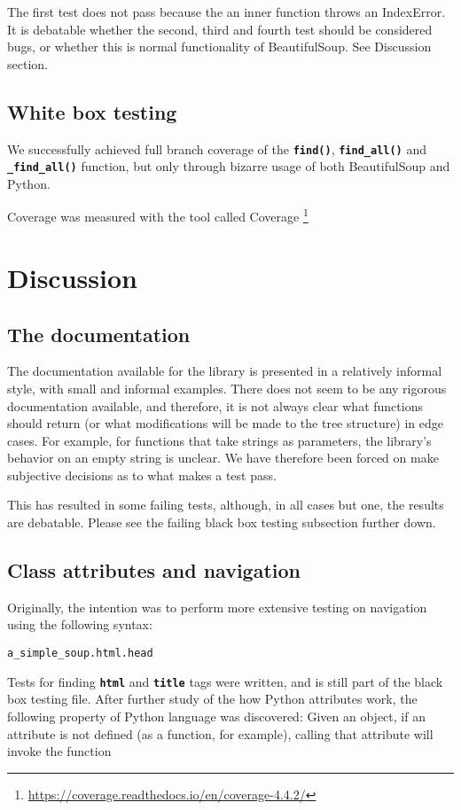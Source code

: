 \documentclass[10pt]{article}
\newcommand{\tbt}[1]{\texttt{\textbf{#1}}}
\begin{document}
The first test does not pass because the an inner function throws an IndexError. \\
It is debatable whether the second, third and fourth test should be considered bugs, or whether this is normal functionality of BeautifulSoup. See Discussion section.

\subsection{White box testing}

We successfully achieved full branch coverage of the \tbt{find()}, \tbt{find\_all()} and \tbt{\_find\_all()} function, but only through bizarre usage of both BeautifulSoup and Python. 

Coverage was measured with the tool called Coverage \footnote{\url{https://coverage.readthedocs.io/en/coverage-4.4.2/}}

\section{Discussion}

\subsection{The documentation}

The documentation available for the library is presented in a relatively informal style, with small and informal examples. There does not seem to be any rigorous documentation available, and therefore, it is not always clear what functions should return (or what modifications will be made to the tree structure) in edge cases. For example, for functions that take strings as parameters, the library's behavior on an empty string is unclear. We have therefore been forced on make subjective decisions as to what makes a test pass. 

This has resulted in some failing tests, although, in all cases but one, the results are debatable. Please see the failing black box testing subsection further down.

\subsection{Class attributes and navigation}

Originally, the intention was to perform more extensive testing on navigation using the following syntax:
\begin{lstlisting}[style = pythonstyle]
a_simple_soup.html.head
\end{lstlisting}
Tests for finding \tbt{html} and \tbt{title} tags were written, and is still part of the black box testing file. After further study of the how Python attributes work, the following property of Python language was discovered: Given an object, if an attribute is not defined (as a function, for example), calling that attribute will invoke the function 
\end{document}
